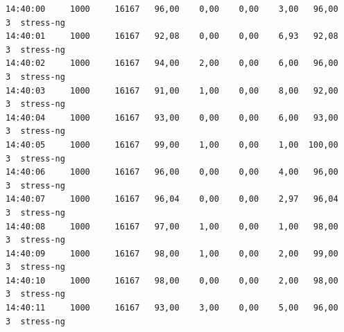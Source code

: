 \begin{verbatim}
14:40:00     1000     16167   96,00    0,00    0,00    3,00   96,00     3  stress-ng
14:40:01     1000     16167   92,08    0,00    0,00    6,93   92,08     3  stress-ng
14:40:02     1000     16167   94,00    2,00    0,00    6,00   96,00     3  stress-ng
14:40:03     1000     16167   91,00    1,00    0,00    8,00   92,00     3  stress-ng
14:40:04     1000     16167   93,00    0,00    0,00    6,00   93,00     3  stress-ng
14:40:05     1000     16167   99,00    1,00    0,00    1,00  100,00     3  stress-ng
14:40:06     1000     16167   96,00    0,00    0,00    4,00   96,00     3  stress-ng
14:40:07     1000     16167   96,04    0,00    0,00    2,97   96,04     3  stress-ng
14:40:08     1000     16167   97,00    1,00    0,00    1,00   98,00     3  stress-ng
14:40:09     1000     16167   98,00    1,00    0,00    2,00   99,00     3  stress-ng
14:40:10     1000     16167   98,00    0,00    0,00    2,00   98,00     3  stress-ng
14:40:11     1000     16167   93,00    3,00    0,00    5,00   96,00     3  stress-ng


\end{verbatim}
